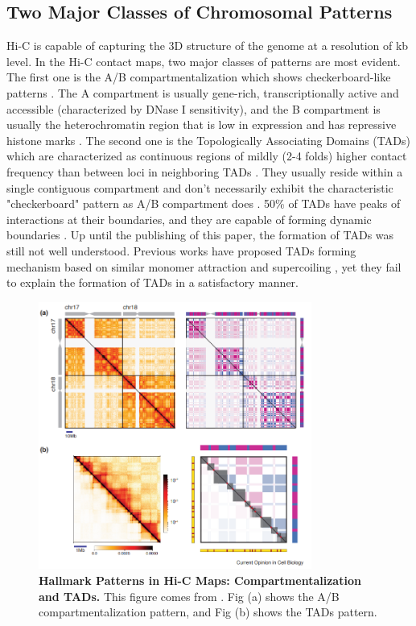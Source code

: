 \documentclass[11pt]{article}
\begin{document}
\subsection{Two Major Classes of Chromosomal Patterns}

Hi-C is capable of capturing the 3D structure of the genome at a resolution of kb level. In the Hi-C contact maps, two major classes of patterns are most evident. The first one is the A/B compartmentalization which shows checkerboard-like patterns \cite{mirny_two_2019}. The A compartment is usually gene-rich, transcriptionally active and accessible (characterized by DNase I sensitivity), and the B compartment is usually the heterochromatin region that is low in expression and has repressive histone marks \cite{denker_second_2016}\cite{wit_decade_2012}. The second one is the Topologically Associating Domains (TADs) which are characterized as continuous regions of mildly (2-4 folds) higher contact frequency than between loci in neighboring TADs \cite{mirny_two_2019}. They usually reside within a single contiguous compartment and don't necessarily exhibit the characteristic "checkerboard" pattern as A/B compartment does \cite{fudenberg_formation_2016}. 50\% of TADs have peaks of interactions at their boundaries, and they are capable of forming dynamic boundaries \cite{rao_3d_2014}. Up until the publishing of this paper, the formation of TADs was still not well understood. Previous works have proposed TADs forming mechanism based on similar monomer attraction \cite{jost_modeling_2014} and supercoiling \cite{benedetti_models_2014}, yet they fail to explain the formation of TADs in a satisfactory manner.

\begin{figure}[htbp]
  \centering
  \includegraphics[width=0.8\textwidth]{assets/Snipaste_2023-01-13_15-53-18.png}
  \caption{\textbf{Hallmark Patterns in Hi-C Maps: Compartmentalization and TADs.} This figure comes from \cite{mirny_two_2019}. Fig (a) shows the A/B compartmentalization pattern, and Fig (b) shows the TADs pattern.}
  \label{fig:TAD}
\end{figure}
\end{document}
